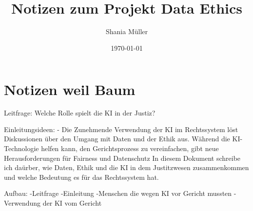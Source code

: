 \documentclass{article}
\title{Notizen zum Projekt Data Ethics}
\author{Shania Müller}
\date{\today}
\begin{document}
\maketitle


\tableofcontents



\section {Notizen weil Baum}

Leitfrage: Welche Rolle spielt die KI in der Justiz?  

Einleitungsideen: 
- Die Zunehmende Verwendung der KI im Rechtssystem löst Diskussionen über den 
Umgang mit Daten und der Ethik aus. Während die KI-Technologie helfen kann, den
Gerichtsprozess zu vereinfachen, gibt neue Herausforderungen für Fairness und Datenschutz
In diesem Dokument schreibe ich daürber, wie Daten, Ethik und die KI in dem Justitzwesen
zusammenkommen und welche Bedeutung es für das Rechtssystem hat.

Aufbau: -Leitfrage -Einleitung -Menschen die wegen KI vor Gericht mussten -Verwendung der KI vom Gericht



\printbibliography
\end{document}
